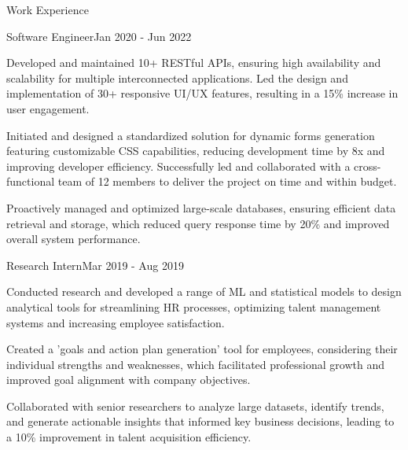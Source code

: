 \documentclass{resume} %
\begin{document}
    \begin{rSection}{Work Experience}
                    \begin{rSubsection}
                {Software Engineer}{Jan 2020 - Jun 2022}
                                    {}
                                {}
                                    \item Developed and maintained 10+ RESTful APIs, ensuring high availability and scalability for multiple interconnected applications. Led the design and implementation of 30+ responsive UI/UX features, resulting in a 15\% increase in user engagement.
                                    \item Initiated and designed a standardized solution for dynamic forms generation featuring customizable CSS capabilities, reducing development time by 8x and improving developer efficiency. Successfully led and collaborated with a cross{-}functional team of 12 members to deliver the project on time and within budget.
                                    \item Proactively managed and optimized large{-}scale databases, ensuring efficient data retrieval and storage, which reduced query response time by 20\% and improved overall system performance.
                            \end{rSubsection}
                    \begin{rSubsection}
                {Research Intern}{Mar 2019 - Aug 2019}
                                    {}
                                {}
                                    \item Conducted research and developed a range of ML and statistical models to design analytical tools for streamlining HR processes, optimizing talent management systems and increasing employee satisfaction. 
                                    \item Created a 'goals and action plan generation' tool for employees, considering their individual strengths and weaknesses, which facilitated professional growth and improved goal alignment with company objectives.
                                    \item Collaborated with senior researchers to analyze large datasets, identify trends, and generate actionable insights that informed key business decisions, leading to a 10\% improvement in talent acquisition efficiency.
                            \end{rSubsection}
            \end{rSection}
\end{document}
